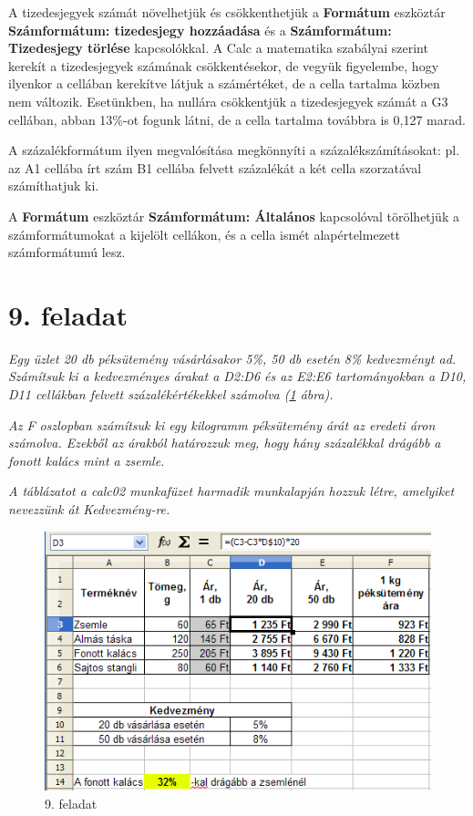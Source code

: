 A tizedesjegyek számát növelhetjük és csökkenthetjük a
\textbf{Formátum} eszköztár \textbf{Számformátum: tizedesjegy
hozzáadása} és a \textbf{Számformátum: Tizedesjegy
törlése} kapcsolókkal. A Calc a matematika szabályai szerint
kerekít a tizedesjegyek számának csökkentésekor, de vegyük
figyelembe, hogy ilyenkor a cellában kerekítve látjuk a
számértéket, de a cella tartalma közben nem változik.
Esetünkben, ha nullára csökkentjük a tizedesjegyek számát a
G3 cellában, abban 13\%-ot fogunk látni, de a cella tartalma
továbbra is 0,127 marad.

A százalékformátum ilyen megvalósítása megkönnyíti a
százalékszámításokat: pl. az A1 cellába írt szám B1
cellába felvett százalékát a két cella szorzatával
számíthatjuk ki.

A \textbf{Formátum} eszköztár \textbf{Számformátum:
Általános} kapcsolóval törölhetjük a számformátumokat a
kijelölt cellákon, és a cella ismét alapértelmezett
számformátumú lesz.


\section{9. feladat}
{\itshape
Egy üzlet 20 db péksütemény vásárlásakor 5\%, 50 db
esetén 8\% kedvezményt ad. Számítsuk ki a kedvezményes
árakat a D2:D6 és az E2:E6 tartományokban a D10, D11 cellákban
felvett százalékértékekkel számolva (\ref{9-feladat} ábra).}

{\itshape
Az F oszlopban számítsuk ki egy kilogramm péksütemény árát
az eredeti áron számolva. Ezekből az árakból határozzuk
meg, hogy hány százalékkal drágább a fonott kalács mint a
zsemle.}

{\itshape
A táblázatot a calc02 munkafüzet harmadik munkalapján hozzuk
létre, amelyiket nevezzünk át Kedvezmény-re.}

\begin{figure}[!h]
\begin{center}
\includegraphics[width=12.857cm]{oocalcv1-img44.png}
\caption{9. feladat}\label{9-feladat}
\end{center}
\end{figure}

